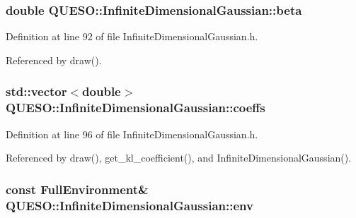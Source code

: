\hypertarget{class_q_u_e_s_o_1_1_infinite_dimensional_gaussian_a36618403cf2767efbde981a43b900a91}{
\subsubsection[{beta}]{\setlength{\rightskip}{0pt plus 5cm}double Q\-U\-E\-S\-O\-::\-Infinite\-Dimensional\-Gaussian\-::beta\hspace{0.3cm}{\ttfamily [private]}}}\label{class_q_u_e_s_o_1_1_infinite_dimensional_gaussian_a36618403cf2767efbde981a43b900a91}


Definition at line 92 of file Infinite\-Dimensional\-Gaussian.\-h.



Referenced by draw().

\hypertarget{class_q_u_e_s_o_1_1_infinite_dimensional_gaussian_abf9b3d144b4804414f328fa3ccca924a}{
\subsubsection[{coeffs}]{\setlength{\rightskip}{0pt plus 5cm}std\-::vector$<$double$>$ Q\-U\-E\-S\-O\-::\-Infinite\-Dimensional\-Gaussian\-::coeffs\hspace{0.3cm}{\ttfamily [private]}}}\label{class_q_u_e_s_o_1_1_infinite_dimensional_gaussian_abf9b3d144b4804414f328fa3ccca924a}


Definition at line 96 of file Infinite\-Dimensional\-Gaussian.\-h.



Referenced by draw(), get\-\_\-kl\-\_\-coefficient(), and Infinite\-Dimensional\-Gaussian().

\hypertarget{class_q_u_e_s_o_1_1_infinite_dimensional_gaussian_a16bf46c24315506ddca4739b05579b92}{
\subsubsection[{env}]{\setlength{\rightskip}{0pt plus 5cm}const {\bf Full\-Environment}\& Q\-U\-E\-S\-O\-::\-Infinite\-Dimensional\-Gaussian\-::env\hspace{0.3cm}{\ttfamily [private]}}}\label{class_q_u_e_s_o_1_1_infinite_dimensional_gaussian_a16bf46c24315506ddca4739b05579b92}


